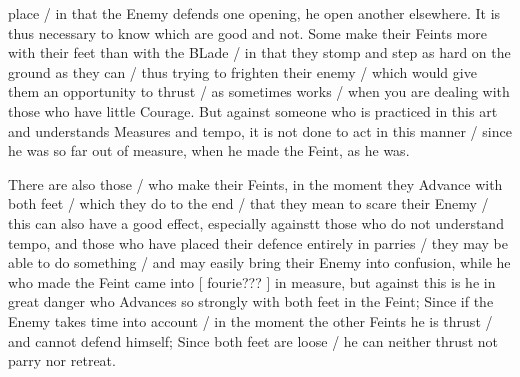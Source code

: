\newpage


\newpage



place / in that the Enemy defends one opening, he open another
elsewhere. It is thus necessary to know which are good and not. Some
make their Feints more with their feet than with the BLade / in that
they stomp and step as hard on the ground as they can / thus trying to
frighten their enemy / which would give them an opportunity to thrust
/ as sometimes works / when you are dealing with those who have little
Courage. But against someone who is practiced in this art and
understands Measures and tempo, it is not done to act in this manner /
since he was so far out of measure, when he made the Feint, as he was.


There are also those / who make their Feints, in the moment they
Advance with both feet / which they do to the end / that they mean to
scare their Enemy / this can also have a good effect, especially
againstt those who do not understand tempo, and those who have placed
their defence entirely in parries / they may be able to do something /
and may easily bring their Enemy into confusion, while he who made the
Feint came into [ fourie??? ] in measure, but against this is he in
great danger who Advances so strongly with both feet in the Feint;
Since if the Enemy takes time into account / in the moment the other
Feints he is thrust / and cannot defend himself; Since both feet are
loose / he can neither thrust not parry nor retreat.

